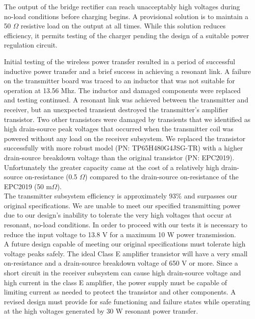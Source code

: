 \documentclass[12pt]{article}
\begin{document}
\indent
The output of the bridge rectifier can reach unacceptably high voltages during no-load conditions before charging begins. A provisional solution is to maintain a 50 $\Omega$ resistive load on the output at all times. While this solution reduces efficiency, it permits testing of the charger pending the design of a suitable power regulation circuit.\\
\hfill

\pagebreak
\indent
Initial testing of the wireless power transfer resulted in a period of successful inductive power transfer and a brief success in achieving a resonant link. A failure on the transmitter board was traced to an inductor that was not suitable for operation at 13.56 Mhz. The inductor and damaged components were replaced and testing continued. A resonant link was achieved between the transmitter and receiver, but an unexpected transient destroyed the transmitter's amplifier transistor. Two other transistors were damaged by transients that we identified as high drain-source peak voltages that occurred when the transmitter coil was powered without any load on the receiver subsystem. We replaced the transistor successfully with more robust model (PN: TP65H480G4JSG-TR) with a higher drain-source breakdown voltage than the original transistor (PN: EPC2019). Unfortunately the greater capacity came at the cost of a relatively high drain-source on-resistance (0.5 $\Omega$) compared to the drain-source on-resistance of the EPC2019 (50 m$\Omega$).\\

\indent
The transmitter subsystem efficiency is approximately 93\% and surpasses our original specifications. We are unable to meet our specified transmitting power due to our design’s inability to tolerate the very high voltages that occur at resonant, no-load conditions. In order to proceed with our tests it is necessary to reduce the input voltage to 13.8 V for a maximum 10 W power transmission. \\

\indent
A future design capable of meeting our original specifications must tolerate high voltage peaks safely. The ideal Class E amplifier transistor will have a very small on-resistance and a drain-source breakdown voltage of 650 V or more. Since a short circuit in the receiver subsystem can cause high drain-source voltage and high current in the class E amplifier, the power supply must be capable of limiting current as needed to protect the transistor and other components. A revised design must provide for safe functioning and failure states while operating at the high voltages generated by 30 W resonant power transfer.\\
\end{document}

